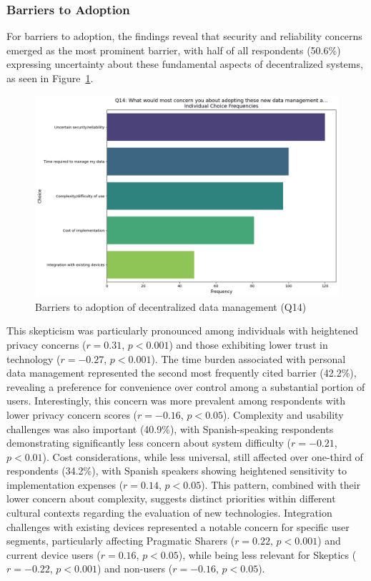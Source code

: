 	\subsubsection{Barriers to Adoption}
		For barriers to adoption, the findings reveal that security and reliability concerns emerged as the most prominent barrier, with half of all respondents (50.6\%) expressing uncertainty about these fundamental aspects of decentralized systems, as seen in Figure~\ref{fig:Q14_barriers}. 
		\begin{figure}[ht]\centering
			\includegraphics[width=0.7\linewidth]{figures/questions/Q14_multiple_choice.png}
			\caption{Barriers to adoption of decentralized data management (Q14)}
			\label{fig:Q14_barriers}
		\end{figure}
		This skepticism was particularly pronounced among individuals with heightened privacy concerns ($r = 0.31$, $p < 0.001$) and those exhibiting lower trust in technology ($r = -0.27$, $p < 0.001$).
		The time burden associated with personal data management represented the second most frequently cited barrier (42.2\%), revealing a preference for convenience over control among a substantial portion of users. Interestingly, this concern was more prevalent among respondents with lower privacy concern scores ($r = -0.16$, $p < 0.05$).
		Complexity and usability challenges was also important (40.9\%), with Spanish-speaking respondents demonstrating significantly less concern about system difficulty ($r = -0.21$, $p < 0.01$). 
		Cost considerations, while less universal, still affected over one-third of respondents (34.2\%), with Spanish speakers showing heightened sensitivity to implementation expenses ($r = 0.14$, $p < 0.05$). This pattern, combined with their lower concern about complexity, suggests distinct priorities within different cultural contexts regarding the evaluation of new technologies.
		Integration challenges with existing devices represented a notable concern for specific user segments, particularly affecting Pragmatic Sharers ($r = 0.22$, $p < 0.001$) and current device users ($r = 0.16$, $p < 0.05$), while being less relevant for Skeptics ($r = -0.22$, $p < 0.001$) and non-users ($r = -0.16$, $p < 0.05$). 
